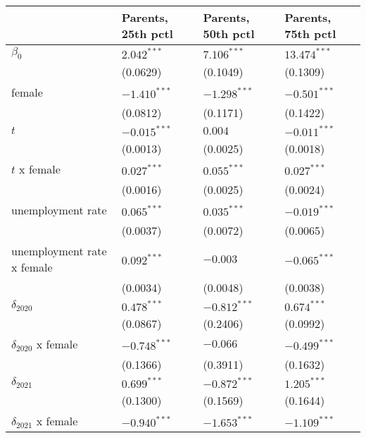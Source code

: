 \begin{tabular}{llll}
\toprule
{} & Parents, 25th pctl & Parents, 50th pctl & Parents, 75th pctl \\
\midrule
$\beta_0$                  &      $2.042^{***}$ &      $7.106^{***}$ &     $13.474^{***}$ \\
                           &           (0.0629) &           (0.1049) &           (0.1309) \\
female                     &     $-1.410^{***}$ &     $-1.298^{***}$ &     $-0.501^{***}$ \\
                           &           (0.0812) &           (0.1171) &           (0.1422) \\
$t$                        &     $-0.015^{***}$ &            $0.004$ &     $-0.011^{***}$ \\
                           &           (0.0013) &           (0.0025) &           (0.0018) \\
$t$ x female               &      $0.027^{***}$ &      $0.055^{***}$ &      $0.027^{***}$ \\
                           &           (0.0016) &           (0.0025) &           (0.0024) \\
unemployment rate          &      $0.065^{***}$ &      $0.035^{***}$ &     $-0.019^{***}$ \\
                           &           (0.0037) &           (0.0072) &           (0.0065) \\
unemployment rate x female &      $0.092^{***}$ &           $-0.003$ &     $-0.065^{***}$ \\
                           &           (0.0034) &           (0.0048) &           (0.0038) \\
$\delta_{2020}$            &      $0.478^{***}$ &     $-0.812^{***}$ &      $0.674^{***}$ \\
                           &           (0.0867) &           (0.2406) &           (0.0992) \\
$\delta_{2020}$ x female   &     $-0.748^{***}$ &           $-0.066$ &     $-0.499^{***}$ \\
                           &           (0.1366) &           (0.3911) &           (0.1632) \\
$\delta_{2021}$            &      $0.699^{***}$ &     $-0.872^{***}$ &      $1.205^{***}$ \\
                           &           (0.1300) &           (0.1569) &           (0.1644) \\
$\delta_{2021}$ x female   &     $-0.940^{***}$ &     $-1.653^{***}$ &     $-1.109^{***}$ \\

\end{tabular}
